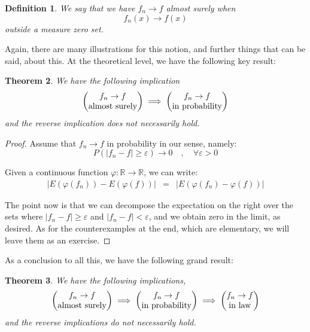 \documentclass[12pt]{amsbook}
\newtheorem{theorem}{Theorem}[chapter]
\newtheorem{definition}[theorem]{Definition}
\begin{document}
\begin{definition}
We say that we have $f_n\to f$ almost surely when 
$$f_n(x)\to f(x)$$
outside a measure zero set.
\end{definition}

Again, there are many illustrations for this notion, and further things that can be said, about this. At the theoretical level, we have the following key result:

\begin{theorem}
We have the following implication
$$\begin{pmatrix}f_n\to f\\ {\rm almost\ surely}\end{pmatrix}\implies
\begin{pmatrix}f_n\to f\\ {\rm in\ probability}\end{pmatrix}$$
and the reverse implication does not necessarily hold.
\end{theorem}

\begin{proof}
Assume that $f_n\to f$ in probability in our sense, namely:
$$P(|f_n-f|\geq\varepsilon)\to 0\quad,\quad\forall\varepsilon>0$$

Given a continuous function $\varphi:\mathbb R\to\mathbb R$, we can write:
\begin{eqnarray*}
|E(\varphi(f_n))-E(\varphi(f))|
&=&|E(\varphi(f_n)-\varphi(f))|
\end{eqnarray*}

The point now is that we can decompose the expectation on the right over the sets where $|f_n-f|\geq\varepsilon$ and $|f_n-f|<\varepsilon$, and we obtain zero in the limit, as desired. As for the counterexamples at the end, which are elementary, we will leave them as an exercise.
\end{proof}

As a conclusion to all this, we have the following grand result:

\begin{theorem}
We have the following implications,
$$\begin{pmatrix}f_n\to f\\ {\rm almost\ surely}\end{pmatrix}\implies
\begin{pmatrix}f_n\to f\\ {\rm in\ probability}\end{pmatrix}\implies
\begin{pmatrix}f_n\to f\\ {\rm in\ law}\end{pmatrix}$$
and the reverse implications do not necessarily hold.
\end{theorem}
\end{document}
